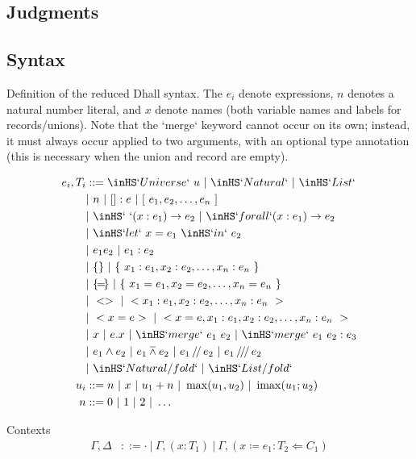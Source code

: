 \documentclass[11pt, twoside, reqno]{book}
\DeclareMathOperator{\imax}{imax}
\providecommand{\wedgeonwedge}{\barwedge}
\begin{document}
\begin{appdices}
\chapter{Judgments}

\section{Syntax}
Definition of the reduced Dhall syntax.
The \(e_i\) denote expressions, \(n\) denotes a natural number literal, and \(x\) denote names (both variable names and labels for records/unions).
Note that the \inHS`merge` keyword cannot occur on its own; instead, it must always occur applied to two arguments, with an optional type annotation (this is necessary when the union and record are empty).

\begin{align*}
e_i, T_i
  & ::= \inHS`Universe`\ u\ |\ \inHS`Natural`\ |\ \inHS`List`\\
  & |\ n\ |\ [] : e\ |\ [\ e_1, e_2, \dots, e_n\ ]\\
  & |\ \inHS`\ `(x : e_1) \to e_2\ |\ \inHS`forall`(x : e_1) \to e_2\\
  & |\ \inHS`let`\ x = e_1\ \inHS`in`\ e_2\\
  & |\ e_1 e_2\ |\ e_1 : e_2\\
  & |\ \{\}\ |\ \{\ x_1 : e_1, x_2 : e_2, \dots, x_n : e_n\ \}\\
  & |\ \{\!=\!\}\ |\ \{\ x_1 = e_1, x_2 = e_2, \dots, x_n = e_n\ \}\\
  & |\ <>\ |\ < x_1 : e_1, x_2 : e_2, \dots, x_n : e_n\ >\\
  & |\ < x = e >\ |\ < x = e, x_1 : e_1, x_2 : e_2, \dots, x_n : e_n\ >\\
  & |\ x\ |\ e.x\ |\ \inHS`merge`\ e_1\ e_2\ |\ \inHS`merge`\ e_1\ e_2 : e_3\\
  & |\ e_1 \land e_2\ |\ e_1 \wedgeonwedge e_2\ |\ e_1 \mathop{/\!/} e_2\ |\ e_1 \mathop{/\!/\!/} e_2\\
  & |\ \inHS`Natural/fold`\ |\ \inHS`List/fold`\\
u_i & ::= n\ |\ x\ |\ u_1+n\ |\ \max(u_1, u_2)\ |\ \imax(u_1; u_2)\\
n & ::= 0\ |\ 1\ |\ 2\ |\ \dots\\
\end{align*}

Contexts
\begin{align*}
\Gamma, \Delta
  & ::= \cdot\ |\ \Gamma, (x : T_1)\ |\ \Gamma, (x \coloneq e_1 : T_2 \Leftarrow C_1)
\end{align*}


\end{appdices}
\end{document}
